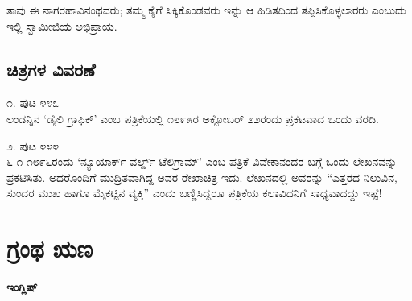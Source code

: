 ತಾವು ಈ ನಾಗರಹಾವಿನಂಥವರು; ತಮ್ಮ ಕೈಗೆ ಸಿಕ್ಕಿಕೊಂಡವರು ಇನ್ನು ಆ ಹಿಡಿತದಿಂದ ತಪ್ಪಿಸಿಕೊಳ್ಳಲಾರರು ಎಂಬುದು ಇಲ್ಲಿ ಸ್ವಾಮೀಜಿಯ ಅಭಿಪ್ರಾಯ.


\section{ಚಿತ್ರಗಳ ವಿವರಣೆ}

೧. ಪುಟ ೪೪೩\\ಲಂಡನ್ನಿನ ‘ಡೈಲಿ ಗ್ರಾಫಿಕ್​’ ಎಂಬ ಪತ್ರಿಕೆಯಲ್ಲಿ ೧೮೯೫ರ ಅಕ್ಟೋಬರ್ ೨೨ರಂದು ಪ್ರಕಟವಾದ ಒಂದು ವರದಿ.

೨. ಪುಟ ೪೪೪\\೬-೧-೧೮೯೬ರಂದು ‘ನ್ಯೂಯಾರ್ಕ್ ವರ್ಲ್ಡ್ ಟೆಲಿಗ್ರಾಮ್​’ ಎಂಬ ಪತ್ರಿಕೆ ವಿವೇಕಾನಂದರ ಬಗ್ಗೆ ಒಂದು ಲೇಖನವನ್ನು ಪ್ರಕಟಿಸಿತು. ಅದರೊಂದಿಗೆ ಮುದ್ರಿತವಾಗಿದ್ದ ಅವರ ರೇಖಾಚಿತ್ರ ಇದು. ಲೇಖನದಲ್ಲಿ ಅವರನ್ನು “ಎತ್ತರದ ನಿಲುವಿನ, ಸುಂದರ ಮುಖ ಹಾಗೂ ಮೈಕಟ್ಟಿನ ವ್ಯಕ್ತಿ” ಎಂದು ಬಣ್ಣಿಸಿದ್ದರೂ ಪತ್ರಿಕೆಯ ಕಲಾವಿದನಿಗೆ ಸಾಧ್ಯವಾದದ್ದು ಇಷ್ಟೆ!

\chapter{ಗ್ರಂಥ ಋಣ}

\textbf{ಇಂಗ್ಲಿಷ್​}


